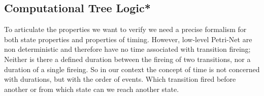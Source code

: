 \subsection{Computational Tree Logic*}
\label{rel_ctl}
To articulate the properties we want to verify we need a precise formalism for both state properties and properties of timing.
However, low-level Petri-Net are non deterministic and therefore have no time associated with transition fireing;
Neither is there a defined duration between the fireing of two transitions, nor a duration of a single fireing.
So in our context the concept of time is not concerned with durations, but with the order of events.
Which transition fired before another or from which state can we reach another state.

